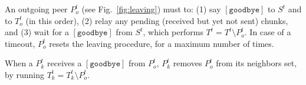 \begin{figure*}
  \caption{Tasks run when an peer $P^t_o$ wants to leave its team
    $T^t$. $P^t_k$ is a neighbor of $P^t_o$ and $S^t$ is the splitter
    of $T^t$.\label{fig:leaving}}
\end{figure*}
An outgoing peer $P^t_o$ (see Fig.~\ref{fig:leaving}) must to: (1) say
$[\mathtt{goodbye}]$ to $S^t$ and to $T^t_o$ (in this order), (2)
relay any pending (received but yet not sent) chunks, and (3) wait for
a $[\mathtt{goodbye}]$ from $S^t$, which performs $T^t = T^t \setminus
P^t_o$. In case of a timeout, $P^t_o$ resets the leaving procedure,
for a maximum number of times.

When a $P^t_k$ receives a $[\mathtt{goodbye}]$ from $P^t_o$, $P^t_k$
removes $P^t_o$ from its neighbors set, by running $T^t_k = T^t_k
\setminus P^t_o$.
